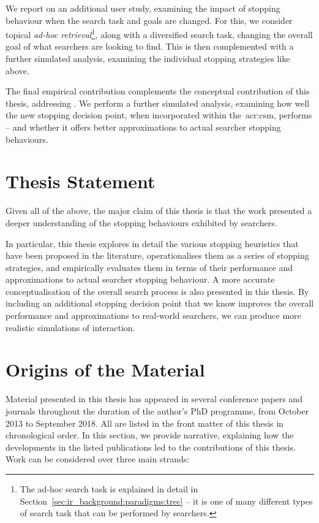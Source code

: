 \noindent
{} We report on an additional user study, examining the impact of stopping behaviour when the search task and goals are changed. For this, we consider topical \emph{ad-hoc retrieval}\footnote{The ad-hoc search task is explained in detail in Section~\ref{sec:ir_background:paradigms:trec} -- it is one of many different types of search task that can be performed by searchers.}\emph{,} along with a diversified search task, changing the overall goal of what searchers are looking to find. This is then complemented with a further simulated analysis, examining the individual stopping strategies like above.

 The final empirical contribution complements the conceptual contribution of this thesis, addressing . We perform a further simulated analysis, examining how well the new stopping decision point, when incorporated within the~\gls{acr:csm}, performs -- and whether it offers better approximations to actual searcher stopping behaviours.

\section{Thesis Statement}
Given all of the above, the major claim of this thesis is that the work presented a deeper understanding of the stopping behaviours exhibited by searchers.

In particular, this thesis explores in detail the various stopping heuristics that have been proposed in the literature, operationalises them as a series of stopping strategies, and empirically evaluates them in terms of their performance and approximations to actual searcher stopping behaviour. A more accurate conceptualisation of the overall search process is also presented in this thesis. By including an additional stopping decision point that we know improves the overall performance and approximations to real-world searchers, we can produce more realistic simulations of interaction.

\section{Origins of the Material}
Material presented in this thesis has appeared in several conference papers and journals throughout the duration of the author's PhD programme, from October 2013 to September 2018. All are listed in the front matter of this thesis in chronological order. In this section, we provide narrative, explaining how the developments in the listed publications led to the contributions of this thesis. Work can be considered over three main strands:

